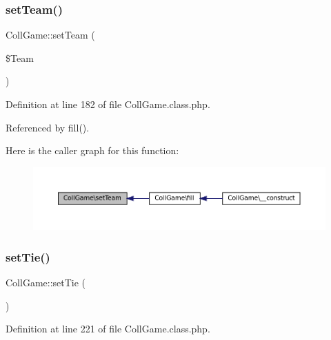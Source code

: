 \mbox{\label{class_coll_game_a3315437cf82b30e45df190b39522d9a1}} 
\subsubsection{\texorpdfstring{set\+Team()}{setTeam()}}
{\footnotesize\ttfamily Coll\+Game\+::set\+Team (\begin{DoxyParamCaption}\item[{}]{\$\+Team }\end{DoxyParamCaption})}



Definition at line 182 of file Coll\+Game.\+class.\+php.



Referenced by fill().

Here is the caller graph for this function\+:\nopagebreak
\begin{figure}[H]
\begin{center}
\leavevmode
\includegraphics[width=350pt]{class_coll_game_a3315437cf82b30e45df190b39522d9a1_icgraph}
\end{center}
\end{figure}
\mbox{\label{class_coll_game_a0a11d0075a6f3cd099813e7df7e0bfdb}} 
\subsubsection{\texorpdfstring{set\+Tie()}{setTie()}}
{\footnotesize\ttfamily Coll\+Game\+::set\+Tie (\begin{DoxyParamCaption}{ }\end{DoxyParamCaption})}



Definition at line 221 of file Coll\+Game.\+class.\+php.

\mbox{\label{class_coll_game_a34dbe12abb0ff79f921443ebf8d5f52a}} 
